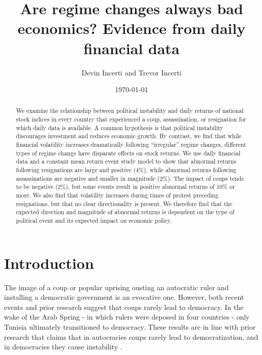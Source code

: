 \documentclass[12pt,final,fleqn]{article}
\theoremstyle{plain}
\begin{document}
\author{Devin Incerti and Trevor Incerti}
\title{\textbf{Are regime changes always bad economics? Evidence from daily financial data}}
\date{\today}
\maketitle

\singlespacing
\begin{abstract}
We examine the relationship between political instability and daily returns of national stock indices in every country that experienced a coup, assassination, or resignation for which daily data is available. A common hypothesis is that political instability discourages investment and reduces economic growth. By contrast, we find that while financial volatility increases dramatically following ``irregular'' regime changes, different types of regime change have disparate effects on stock returns. We use daily financial data and a constant mean return event study model to show that abnormal returns following resignations are large and positive (4\%), while abnormal returns following assassinations are negative and smaller in magnitude (2\%). The impact of coups tends to be negative (2\%), but some events result in positive abnormal returns of 10\% or more. We also find that volatility increases during times of protest preceding resignations, but that no clear directionality is present. We therefore find that the expected direction and magnitude of abnormal returns is dependent on the type of political event and its expected impact on economic policy.
\end{abstract}
\doublespacing

\section{Introduction} \label{sec:Introduction}

The image of a coup or popular uprising ousting an autocratic ruler and installing a democratic government is an evocative one. However, both recent events and prior research suggest that coups rarely lead to democracy. In the wake of the Arab Spring - in which rulers were deposed in four countries - only Tunisia ultimately transitioned to democracy. These results are in line with prior research that claims that in autocracies coups rarely lead to democratization, and in democracies they cause instability \citep{derpanopoulos2015coups, marinov2014coups, powell2011global, thyne2016coup, varol2011democratic}.
\end{document}
